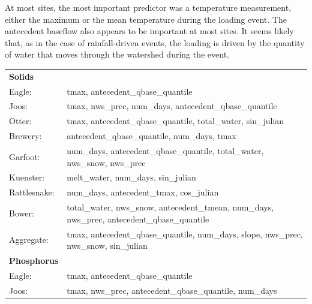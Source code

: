 \documentclass[10pt]{article}
\begin{document}
At most sites, the most important predictor was a temperature measurement, either the maximum or the mean temperature during the loading event. The antecedent baseflow also appears to be important at most sites. It seems likely that, as in the case of rainfall-driven events, the loading is driven by the quantity of water that moves through the watershed during the event.\\

\begin{table}[h!]\small
    \begin{center}
    \begin{tabular}{ll}
        \textbf{Solids} & \\
        \hspace{5mm} Eagle: & tmax, antecedent\_qbase\_quantile\\
        \hspace{5mm} Joos: & tmax, nws\_prec, num\_days, antecedent\_qbase\_quantile\\
        \hspace{5mm} Otter: & tmax, antecedent\_qbase\_quantile, total\_water, sin\_julian\\
        \hspace{5mm} Brewery: & antecedent\_qbase\_quantile, num\_days, tmax\\
        \hspace{5mm} Garfoot: & num\_days, antecedent\_qbase\_quantile, total\_water, nws\_snow, nws\_prec\\
        \hspace{5mm} Kuenster: & melt\_water, num\_days, sin\_julian\\
        \hspace{5mm} Rattlesnake: & num\_days, antecedent\_tmax, cos\_julian \\
        \hspace{5mm} Bower: & total\_water, nws\_snow, antecedent\_tmean, num\_days, nws\_prec, antecedent\_qbase\_quantile\\
        \hspace{5mm} Aggregate: & tmax, antecedent\_qbase\_quantile, num\_days, slope, nws\_prec, nws\_snow, sin\_julian
    \vspace{2mm}\\
        \textbf{Phosphorus} & \\
        \hspace{5mm} Eagle: & tmax, antecedent\_qbase\_quantile\\
        \hspace{5mm} Joos: & tmax, nws\_prec, antecedent\_qbase\_quantile, num\_days\\

\end{tabular}
\end{center}
\end{table}
\end{document}

